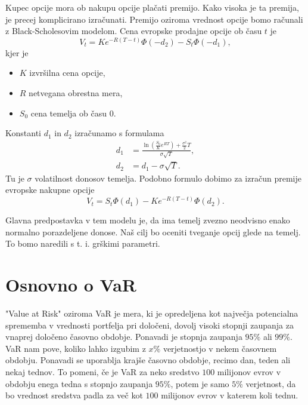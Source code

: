 \documentclass[12pt,a4paper]{amsart}
\theoremstyle{definition} %
\theoremstyle{definition}
\theoremstyle{definition}
\theoremstyle{definition}
\theoremstyle{plain} %
\begin{document}
Kupec opcije mora ob nakupu opcije plačati premijo. Kako visoka je ta premija, je precej komplicirano izračunati.
Premijo oziroma vrednost opcije bomo računali z Black-Scholesovim modelom. Cena evropske prodajne opcije ob času $t$ je 
\begin{equation}\label{prodajna}
    V_t = Ke^{-R(T-t)}\Phi(-d_2)-S_t\Phi(-d_1),
\end{equation}
kjer je
\begin{itemize}
    \item $K$ izvršilna cena opcije,
    \item $R$ netvegana obrestna mera,
    \item $S_0$ cena temelja ob času $0$.
\end{itemize}
Konstanti $d_1$ in $d_2$ izračunamo s formulama
\begin{equation}
    \begin{aligned}
        d_1 &= \frac{\ln(\frac{S_0}{K}e^{RT})+\frac{\sigma^2}{2}T}{\sigma\sqrt{T}},\\
    d_2 &= d_1-\sigma\sqrt{T}. 
    \end{aligned}
\end{equation}
Tu je $\sigma$ volatilnost donosov temelja. Podobno formulo dobimo za izračun premije evropske nakupne opcije
\begin{equation}\label{nakupna}
    V_t = S_t\Phi(d_1) - Ke^{-R(T-t)}\Phi(d_2).
\end{equation}

Glavna predpostavka v tem modelu je, da ima temelj zvezno neodvisno enako normalno porazdeljene donose.
Naš cilj bo oceniti tveganje opcij glede na temelj. To bomo naredili s t. i. grškimi parametri.
\section{Osnovno o VaR}

"Value at Risk" oziroma VaR je mera, ki je opredeljena kot največja potencialna sprememba v vrednosti portfelja pri določeni,
dovolj visoki stopnji zaupanja za vnaprej določeno časovno obdobje. Ponavadi je stopnja zaupanja $95\%$ ali $99\%$.
VaR nam pove, koliko lahko izgubim z $x\%$ verjetnostjo v nekem časovnem obdobju. Ponavadi se uporablja
krajše časovno obdobje, recimo dan, teden ali nekaj tednov.
To pomeni, če je VaR za neko sredstvo $100$ milijonov evrov v obdobju enega tedna s stopnjo zaupanja $95\%$,
potem je samo $5\%$ verjetnost, da bo vrednost sredstva padla za več kot $100$ milijonov evrov v katerem koli tednu.
\end{document}
